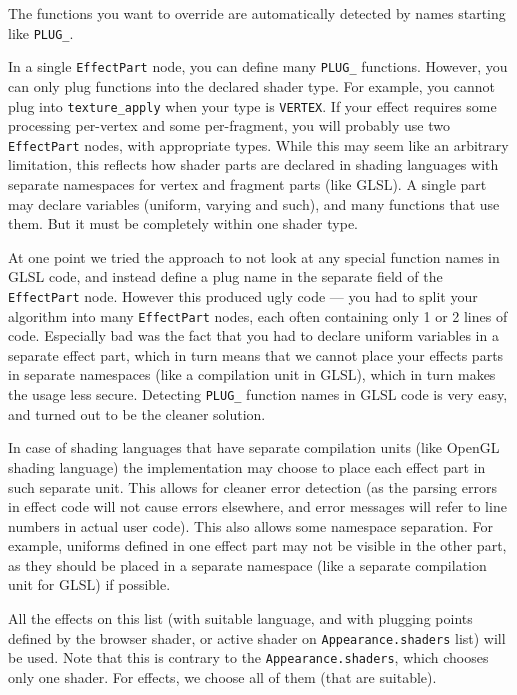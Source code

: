 \documentclass{acmsiggraph}                     %
\begin{document}
The functions you want to override are automatically detected by names
starting like \texttt{PLUG\_}.

In a single \texttt{EffectPart} node, you can define many \texttt{PLUG\_}
functions. However, you can only plug functions into the declared shader
type. For example, you cannot plug into \texttt{texture\_apply} when
your type is \texttt{VERTEX}.
If your effect requires some processing per-vertex and some per-fragment,
you will probably use two \texttt{EffectPart} nodes, with appropriate types.
While this may seem like an arbitrary limitation,
this reflects how shader parts are declared in shading languages with
separate namespaces for vertex and fragment parts (like GLSL).
A single part may declare variables (uniform, varying and such),
and many functions that use them. But it must be completely within
one shader type.

At one point we tried the approach
to not look at any special function names in GLSL code,
and instead define a plug name in the separate field of the \texttt{EffectPart}
node. However this produced ugly code --- you had to split your algorithm
into many \texttt{EffectPart} nodes, each often containing only 1 or 2 lines
of code. Especially bad was the fact that you had to declare uniform variables
in a separate effect part, which in turn means that we cannot place
your effects parts in separate namespaces (like a compilation unit in GLSL),
which in turn makes the usage less secure.
Detecting \texttt{PLUG\_} function names in GLSL code is very easy,
and turned out to be the cleaner solution.

In case of shading languages that have separate compilation units
(like OpenGL shading language) the implementation may choose to place
each effect part in such separate unit. This allows for cleaner error detection
(as the parsing errors in effect code will not cause errors elsewhere,
and error messages will refer to line numbers in actual user code).
This also allows some namespace separation. For example, uniforms defined in one
effect part may not be visible in the other part, as they should be placed
in a separate namespace (like a separate compilation unit for GLSL) if possible.

All the effects on this list (with suitable language, and with
plugging points defined by the browser shader, or active shader on
\texttt{Appearance.shaders} list) will be used. Note that this is contrary to
the \texttt{Appearance.shaders}, which chooses only one shader.
For effects, we choose all of them (that are suitable).
\end{document}
